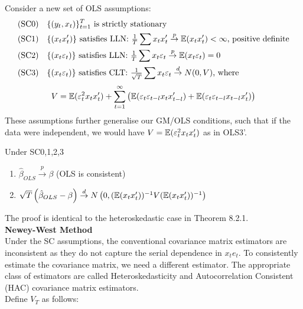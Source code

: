 \documentclass[DIV=14,titlepage=false]{scrreprt}
\begin{document}
Consider a new set of OLS assumptions:
\begin{align*}
    \text{(SC0)}& \quad \{(y_t, x_t)\}^T_{t=1} \text{ is strictly stationary}\\
    \text{(SC1)}& \quad \{(x_tx_t')\} \text{ satisfies LLN: }\tfrac{1}{T}\sum x_t x_t' \overset{p}{\to} \mathbb{E}(x_t x_t') < \infty \text{, positive definite}\\
    \text{(SC2)}& \quad \{(x_t \varepsilon_t)\} \text{ satisfies LLN: }\tfrac{1}{T}\sum x_t \varepsilon_t \overset{p}{\to} \mathbb{E}(x_t \varepsilon_t) =0\\
    \text{(SC3)}& \quad \{(x_t \varepsilon_t)\} \text{ satisfies CLT: }\tfrac{1}{\sqrt{T}}\sum x_t \varepsilon_t \overset{d}{\to} N(0,V) \text{, where }
\end{align*}
\[ V= \mathbb{E}(\varepsilon_t^2 x_t x_t')+\sum_{t=1}^{\infty}\left(\mathbb{E}(\varepsilon_t \varepsilon_{t-l} x_t x_{t-l}') + \mathbb{E}(\varepsilon_t \varepsilon_{t-l} x_{t-l} x_{t}')\right)\]
These assumptions further generalise our GM/OLS conditions, such that if the data were independent, we would have $V=\mathbb{E}(\varepsilon_t^2x_tx_t')$ as in OLS3'.

\begin{theorem}
    Under SC0,1,2,3
    \begin{enumerate}
        \item $\hat \beta_{OLS} \overset{p}{\to} \beta$ (OLS is consistent)
        \item $\sqrt{T}\left(\hat \beta_{OLS} -\beta\right) \overset{d}{\to} N\left(0,(\mathbb{E}(x_tx_t'))^{-1}V (\mathbb{E}(x_tx_t'))^{-1}\right)$
    \end{enumerate}
\end{theorem}
The proof is identical to the heteroskedastic case in Theorem 8.2.1.\\

\textbf{Newey-West Method}\\
Under the SC assumptions, the conventional covariance matrix estimators are inconsistent as they do not capture the serial dependence in $x_te_t$. To consistently estimate the covariance matrix, we need a different estimator. The appropriate class of estimators are called Heteroskedasticity and Autocorrelation Consistent (HAC) covariance matrix estimators.\\

Define $V_T$ as follows:
\end{document}
